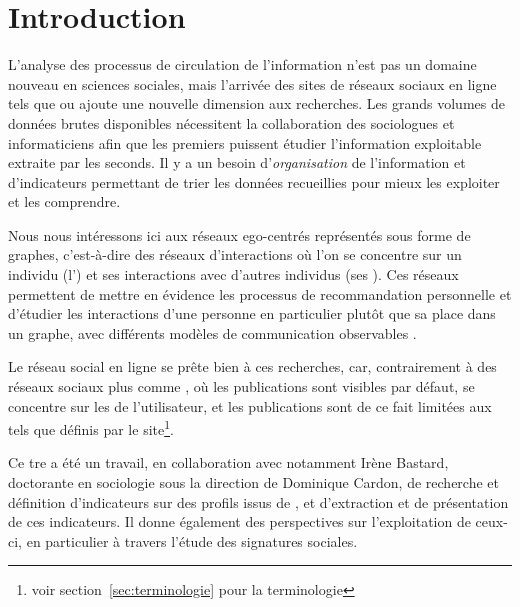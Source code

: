 
\section{Introduction}

L’analyse des processus de circulation de l’information n’est pas un domaine
nouveau en sciences sociales, mais l’arrivée des sites de réseaux sociaux en
ligne tels que \fb{} ou \twt{} ajoute une nouvelle dimension aux
recherches. Les grands volumes de données brutes disponibles nécessitent la
collaboration des sociologues et informaticiens afin que les premiers puissent
étudier l’information exploitable extraite par les seconds. Il y a un besoin
d’\emph{organisation} de l’information et d’indicateurs permettant de trier les
données recueillies pour mieux les exploiter et les comprendre.

Nous nous intéressons ici aux réseaux ego-centrés représentés sous forme de
graphes, c’est-à-dire des réseaux d’interactions où l’on se concentre sur un
individu (l’) et ses interactions avec d’autres individus (ses
). Ces réseaux permettent de mettre en évidence les processus de
recommandation personnelle et d’étudier les interactions d’une personne en
particulier plutôt que sa place dans un graphe, avec différents modèles de
communication observables \citep{Raux2011}.

Le réseau social en ligne \fb{} se prête bien à ces recherches, car,
contrairement à des réseaux sociaux plus  comme \twt{}, où les
publications sont visibles par défaut, \fb{} se concentre sur les 
de l’utilisateur, et les publications sont de ce fait limitées aux 
tels que définis par le site\footnote{voir section~\ref{sec:terminologie} pour
la terminologie}.

Ce {\sc tre} a été un travail, en collaboration avec notamment Irène Bastard,
doctorante en sociologie sous la direction de Dominique Cardon, de recherche et
définition d’indicateurs sur des profils issus de \fb{}, et d’extraction
et de présentation de ces indicateurs. Il donne également des perspectives sur
l’exploitation de ceux-ci, en particulier à travers l’étude des signatures
sociales.
